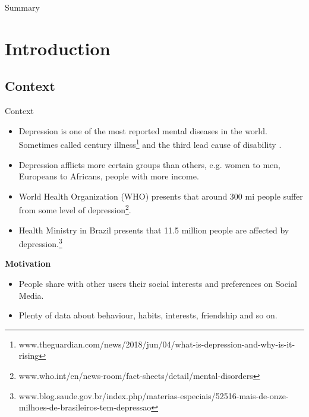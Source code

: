 \documentclass[aspectratio=169,10pt,xcolor={dvipsnames}]{beamer}
\begin{document}


\begin{frame}{Summary}
\tableofcontents
\end{frame}

\section{Introduction}
\subsection{Context}
\begin{frame}{Context}

\small{
  \begin{block}{}
    \begin{itemize}
      \item Depression is one of the most reported mental diseases in the world. Sometimes called century illness\footnote{www.theguardian.com/news/2018/jun/04/what-is-depression-and-why-is-it-rising} and the third lead cause of disability \cite{IHME}.
      \item Depression afflicts more certain groups than others, e.g. women to men, Europeans to Africans, people with more income.
      \item World Health Organization (WHO) presents that around 300 mi people suffer from some level of depression\footnote{www.who.int/en/news-room/fact-sheets/detail/mental-disorders}.
      \item Health Ministry in Brazil presents that 11.5 million people are affected by depression.\footnote{www.blog.saude.gov.br/index.php/materias-especiais/52516-mais-de-onze-milhoes-de-brasileiros-tem-depressao}
    \end{itemize}    
  \end{block}
}

\small{
  \begin{block}{\small{\textbf{Motivation}}}
    \begin{itemize}
      \item People share with other users their social interests and preferences on Social Media.
      \item Plenty of data about behaviour, habits, interests, friendship and so on.
    \end{itemize}
  \end{block}    
}
\end{frame}
\end{document}

